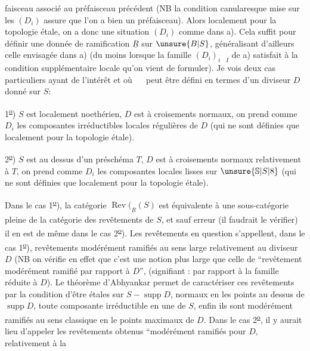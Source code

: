 faisceau associé au préfaisceau précédent (NB la condition canularesque mise sur les $(D_i)$ assure que l'on a bien un préfaisceau). Alors localement pour la topologie étale, on a donc une situation $(D_i)$ comme dans a). Cela suffit pour définir une donnée de ramification $\underline{R}$ sur $\unsure{B|S}$, généralisant d'ailleurs celle envisagée dans a) (du moins lorsque la famille $(D_i)_{i\quad I}$ de a) satisfait à la condition supplémentaire locale qu'on vient de formuler). Je vois deux cas particuliers ayant de l'intérêt  et  où $\quad$ peut être défini en termes d'un diviseur $D$ donné sur $S$:

1\textsuperscript{\uline{o}}) $S$ est localement noethérien, $D$ est à croisements normaux, on prend comme $D_i$ les composantes irréductibles locales régulières de $D$ (qui ne sont définies que localement pour la topologie étale).

2\textsuperscript{\uline{o}}) $S$ est au dessus d'un préschéma $T$, $D$ est à croisements normaux relativement à $T$, on prend comme $D_i$ les composantes locales lisses sur $\unsure{\mathbb{S}|S|8}$ (qui ne sont définies que localement pour la topologie étale).

Dans le cas 1\textsuperscript{\uline{o}}), la catégorie $\operatorname{Rev}(_{\underline{R}}(S)$ est équivalente à une sous-catégorie pleine de la catégorie des revêtements de $S$, et sauf erreur (il faudrait le vérifier) il en est de même dans le cas 2\textsuperscript{\uline{o}}). Les revêtements en question s'appellent, dans le cas 1\textsuperscript{\uline{o}}), revêtements modérément ramifiés au sens large relativement au diviseur $D$ (NB on vérifie en effet que c'est une notion plus large que celle de ``revêtement modérément ramifié par rapport à $D$'', (signifiant : par rapport à la famille réduite à $D$). Le théorème d'Abhyankar permet de caractériser ces revêtements par la condition d'être étales sur  $S-\operatorname{supp}D$, normaux en les points au dessus de $\operatorname{supp}D$, toute composante irréductible en  une de $S$, enfin ils sont modérément ramifiés au sens classique en le points maximaux de $D$. Dans le cas 2\textsuperscript{\uline{o}}, il y aurait lieu d'appeler les revêtements obtenus ``modérément ramifiés pour $D$, relativement à la
